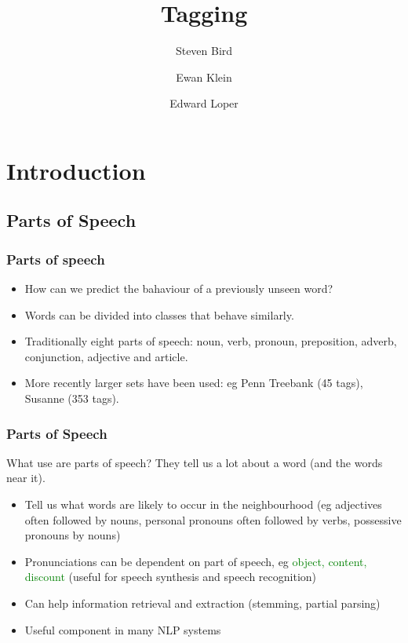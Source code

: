 \documentclass{beamer}             %
\title{Tagging}
\author{Steven Bird \and Ewan Klein \and Edward Loper}
\institute{
  University of Melbourne, AUSTRALIA
  \and
  University of Edinburgh, UK
  \and
  University of Pennsylvania, USA
}
\begin{document}
\frame{\titlepage}

\section{Introduction}

\subsection{Parts of Speech}

\begin{frame}
  \frametitle{Parts of speech}

  \begin{itemize}
  \item How can we predict the bahaviour of a previously unseen word?
  \item Words can be divided into classes that behave similarly.
  \item Traditionally eight parts of speech: noun, verb,
    pronoun, preposition, adverb, conjunction, adjective and article.
  \item More recently larger sets have been used: eg Penn Treebank (45
    tags), Susanne (353 tags).
  \end{itemize}
\end{frame}

\begin{frame}
  \frametitle{Parts of Speech}

  \begin{alertblock}{What use are parts of speech?}
    They tell us a lot about a word (and the words near it).
  \end{alertblock}

  \pause
  \begin{itemize}
  \item Tell us what words are likely to occur in the neighbourhood
    (eg adjectives often followed by nouns, personal pronouns often
    followed by verbs, possessive pronouns by nouns)
  \item Pronunciations can be dependent on part of speech, eg
    \textcolor{green}{object, content, discount} (useful for speech
    synthesis and speech recognition)
  \item Can help information retrieval and extraction (stemming,
    partial parsing) 
  \item Useful component in many NLP systems
  \end{itemize}
  
\end{frame}
\end{document}
